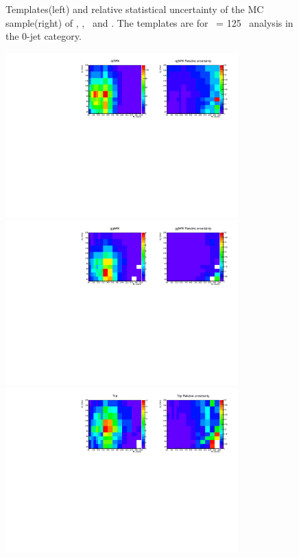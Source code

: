 \begin{figure}[htp]
\caption{Templates(left) and relative statistical uncertainty of the MC sample(right) 
of \qqWH, \qqZH, \qqH\ and \ggH. 
The templates are for \mHi\ = 125 \GeV\ analysis in the 0-jet category.}
\label{fig:2dtemplate_125_0j_1}
\end{figure}

\begin{figure}[htp]
\centering
\includegraphics[width=0.8\textwidth]{figures/2dtemplate_qqWW_mH125_0j.pdf}
\includegraphics[width=0.8\textwidth]{figures/2dtemplate_ggWW_mH125_0j.pdf}
\includegraphics[width=0.8\textwidth]{figures/2dtemplate_Top_mH125_0j.pdf}

\end{figure}
